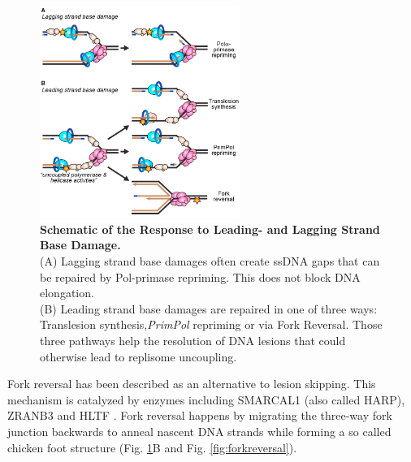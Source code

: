 \begin{figure}
    \includegraphics[width=0.58\textwidth]{resources/images/Intro/lesionskipping.png}
    \caption[Schematic of the Response to Leading- and Lagging Strand Base Damage]{\textbf{Schematic of the Response to Leading- and Lagging Strand Base Damage.}\\
    (A) Lagging strand base damages often create ssDNA gaps that can be repaired by Pol\textalpha-primase repriming. This does not block DNA elongation.\\
    (B) Leading strand base damages are repaired in one of three ways: Translesion synthesis,\textit{PrimPol} repriming or via Fork Reversal. Those three pathways help the resolution of DNA lesions that could otherwise lead to replisome uncoupling. \citep{Cortez.2019}}
    \label{fig:lesionskipping}
\end{figure}
Fork reversal has been described as an alternative to lesion skipping. This mechanism is catalyzed by enzymes including SMARCAL1 (also called HARP), ZRANB3 and HLTF \citep{Betous.2012, Kile.2015}. Fork reversal happens by migrating the three-way fork junction backwards to anneal nascent DNA strands while forming a so called chicken foot structure (Fig. \ref{fig:lesionskipping}B and Fig. \ref{fig:forkreversal}).

